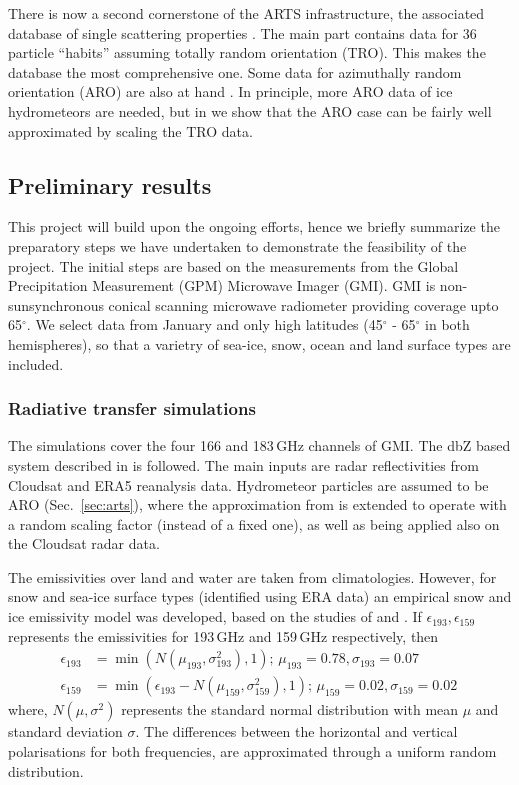 \documentclass[12pt,oneside,a4paper]{article}
\begin{document}
There is now a second cornerstone of the ARTS infrastructure, the associated
database of single scattering properties \citep{eriksson:agene:18}. The main
part contains data for 36 particle ``habits'' assuming totally random
orientation (TRO). This makes the database the most comprehensive one. Some
data for azimuthally random orientation (ARO) are also at hand
\citep{brath:micro:20}. In principle, more ARO data of ice hydrometeors are
needed, but in \citet{barlakas:intro:21} we show that the ARO case can be
fairly well approximated by scaling the TRO data.

\subsection{Preliminary results}
%
This project will build upon the ongoing efforts, hence we briefly summarize
the preparatory steps we have undertaken to demonstrate the feasibility of the
project. The initial steps are based on the measurements from the Global
Precipitation Measurement (GPM) Microwave Imager (GMI). GMI is
non-sunsynchronous conical scanning microwave radiometer providing coverage
upto 65$^{\circ}$. We select data from January and only high latitudes
(45$^{\circ}$ - 65$^{\circ}$ in both hemispheres), so that a varietry of
sea-ice, snow, ocean and land surface types are included.

\subsubsection{Radiative transfer simulations}
%
\label{sec:radiative_transfer}
The simulations cover the four 166 and 183\,GHz channels of GMI. The dbZ based
system described in \citet{ekelund:using:20} is followed. The
main inputs are radar reflectivities from Cloudsat and ERA5 reanalysis data.
Hydrometeor particles are assumed to be ARO (Sec.~\ref{sec:arts}), where the
approximation from \citet{barlakas:intro:21} is extended to operate with 
a random scaling factor (instead of a fixed one), as well as being applied also
on the Cloudsat radar data.

The emissivities over land and water are taken from climatologies. However, for
snow and sea-ice surface types (identified using ERA data) an empirical snow
and ice emissivity model was developed, based on the studies of
\citet{harlow:2009:milli} and \citet{hewison:2002:airbo}. If
$\epsilon_{193}, \epsilon_{159}$ represents the emissivities for 193\,GHz and
159\,GHz respectively, then
\begin{align}
\epsilon_{193}& = \min({N(\mu_{193}, \sigma_{193}^{2}), 1});\, \mu_{193} = 0.78, \sigma_{193} = 0.07 \label{eq:1}\\
\epsilon_{159}& = \min(\epsilon_{193} - N(\mu_{159}, \sigma_{159}^{2}), 1) ;\,  \mu_{159} = 0.02, \sigma_{159} = 0.02\,\label{eq:2}
\end{align}
where, $N(\mu, \sigma^{2})$ represents the standard normal distribution with
mean $\mu$ and standard deviation $\sigma$. The differences between the
horizontal and vertical polarisations for both frequencies, are 
approximated through a uniform random distribution.
\end{document}
